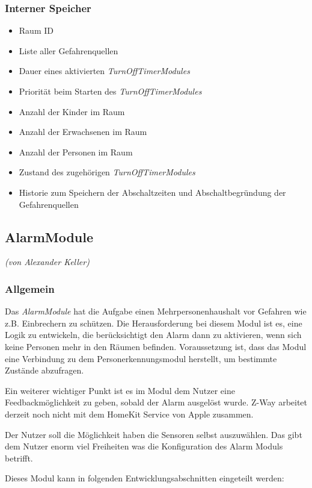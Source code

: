 \subsubsection{Interner Speicher}
\begin{itemize}
	\item Raum ID
	\item Liste aller Gefahrenquellen
	\item Dauer eines aktivierten \emph{TurnOffTimerModules}
	\item Priorität beim Starten des \emph{TurnOffTimerModules}
	\item Anzahl der Kinder im Raum
	\item Anzahl der Erwachsenen im Raum
	\item Anzahl der Personen im Raum
	\item Zustand des zugehörigen \emph{TurnOffTimerModules}
	\item Historie zum Speichern der Abschaltzeiten und Abschaltbegründung der Gefahrenquellen
\end{itemize}

\newpage
\subsection{AlarmModule}
\emph{(von Alexander Keller)}

\subsubsection{Allgemein}
Das \emph{AlarmModule} hat die Aufgabe einen Mehrpersonenhaushalt vor Gefahren wie z.B. Einbrechern zu schützen. Die Herausforderung bei diesem Modul ist es, eine Logik zu entwickeln, die berücksichtigt den Alarm dann zu aktivieren, wenn sich keine Personen mehr in den Räumen befinden. Voraussetzung ist, dass das Modul eine Verbindung zu dem Personerkennungsmodul herstellt, um bestimmte Zustände abzufragen.

Ein weiterer wichtiger Punkt ist es im Modul dem Nutzer eine Feedbackmöglichkeit zu geben, sobald der Alarm ausgelöst wurde. Z-Way arbeitet derzeit noch nicht mit dem HomeKit Service von Apple zusammen.

Der Nutzer soll die Möglichkeit haben die Sensoren selbst auszuwählen. Das gibt dem Nutzer enorm viel Freiheiten was die Konfiguration des Alarm Moduls betrifft.

\noindent
Dieses Modul kann in folgenden Entwicklungsabschnitten eingeteilt werden:

